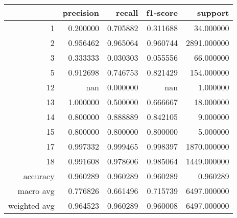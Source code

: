 \begin{tabular}{rrrrr}
\toprule
 & precision & recall & f1-score & support \\
\midrule
1 & 0.200000 & 0.705882 & 0.311688 & 34.000000 \\
2 & 0.956462 & 0.965064 & 0.960744 & 2891.000000 \\
3 & 0.333333 & 0.030303 & 0.055556 & 66.000000 \\
5 & 0.912698 & 0.746753 & 0.821429 & 154.000000 \\
12 & nan & 0.000000 & nan & 1.000000 \\
13 & 1.000000 & 0.500000 & 0.666667 & 18.000000 \\
14 & 0.800000 & 0.888889 & 0.842105 & 9.000000 \\
15 & 0.800000 & 0.800000 & 0.800000 & 5.000000 \\
17 & 0.997332 & 0.999465 & 0.998397 & 1870.000000 \\
18 & 0.991608 & 0.978606 & 0.985064 & 1449.000000 \\
accuracy & 0.960289 & 0.960289 & 0.960289 & 0.960289 \\
macro avg & 0.776826 & 0.661496 & 0.715739 & 6497.000000 \\
weighted avg & 0.964523 & 0.960289 & 0.960008 & 6497.000000 \\
\bottomrule
\end{tabular}
